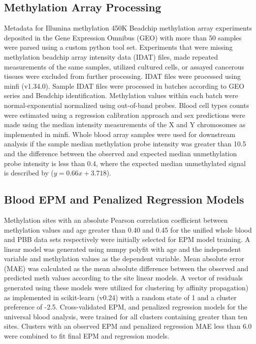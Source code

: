\documentclass{article}
\begin{document}
{{\begin{linenumbers}
\subsection{ Methylation Array Processing}

Metadata for Illumina methylation 450K Beadchip methylation array experiments deposited in the Gene Expression 
Omnibus (GEO) \cite{Barrett2012-gu} with more than 50 samples were parsed using a custom python tool set. Experiments 
that were missing methylation beadchip array intensity data (IDAT) files, made repeated measurements of the same 
samples, utilized cultured cells, or assayed cancerous tissues were excluded from further processing. IDAT files 
were processed using minfi\cite{Aryee2014-ky} (v1.34.0). Sample IDAT files were processed in batches according to 
GEO series and Beadchip  identification. Methylation values within each batch were normal-exponential normalized 
using out-of-band probes\cite{Triche2013-pp}. Blood cell types counts were estimated using a regression calibration 
approach\cite{Houseman2012-rr} and sex predictions were made using the median intensity measurements of the X and Y 
chromosomes as implemented in minfi\cite{Aryee2014-ky}. Whole blood array samples were used for downstream analysis 
if the sample median methylation probe intensity was greater than 10.5 and the difference between the observed and 
expected median unmethylation probe intensity is less than 0.4, where the expected median unmethylated signal is 
described by ($y=0.66x + 3.718$). 

\subsection{Blood EPM and Penalized Regression Models}

Methylation sites with an absolute Pearson correlation coefficient between methylation values and age greater than 
0.40 and 0.45 for the unified whole blood and PBB data sets respectively were initially selected for EPM model 
training. A linear model was generated using numpy polyfit \cite{Harris2020-yb} with age and the independent 
variable and methylation values as the dependent variable. Mean absolute error (MAE) was calculated as the mean 
absolute difference between the observed and predicted meth values according to the site linear models. A vector 
of residuals generated using these models were utilized for clustering by affinity propagation\cite{Frey2007-mu}) 
as implemented in scikit-learn (v0.24)\cite{Pedregosa2011-fi} with a random state of 1 and a cluster preference of 
-2.5. Cross-validated EPM, and penalized regression models for the universal blood analysis,  were trained for all 
clusters containing greater than ten sites. Clusters with an observed EPM and penalized regression MAE less than 6.0 
were combined to fit final EPM and regression models. 


\end{linenumbers}}}
\end{document}
